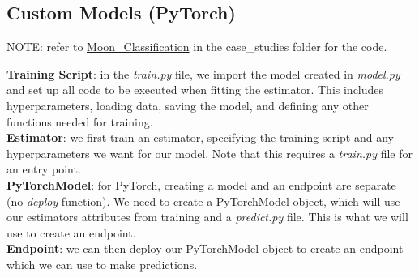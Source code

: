 \documentclass[11pt, a4paper]{article}
\begin{document}
\begin{spacing}{1.1}
	\subsection{Custom Models (PyTorch)}
	\begin{center}
	\color{darkgray} NOTE: refer to \href{file:///E:/Documents/UdacityNotes/ML\%20Engineer/sample_code/case_studies/Moon_Classification.html}{Moon\_Classification} in the case\_studies folder for the code. \color{black}
	\end{center}
	\textbf{Training Script}: in the \textit{train.py} file, we import the model created in \textit{model.py} and set up all code to be executed when fitting the estimator. This includes hyperparameters, loading data, saving the model, and defining any other functions needed for training. \vspace*{2mm}\\
	\textbf{Estimator}: we first train an estimator, specifying the training script and any hyperparameters we want for our model. Note that this requires a \textit{train.py} file for an entry point. \vspace*{2mm}\\
	\textbf{PyTorchModel}: for PyTorch, creating a model and an endpoint are separate (no \textit{deploy} function). We need to create a PyTorchModel object, which will use our estimators attributes from training and a \textit{predict.py} file. This is what we will use to create an endpoint.\vspace*{2mm}\\
	\textbf{Endpoint}: we can then deploy our PyTorchModel object to create an endpoint which we can use to make predictions.\vspace*{2mm}
	

\end{spacing}
\end{document}
